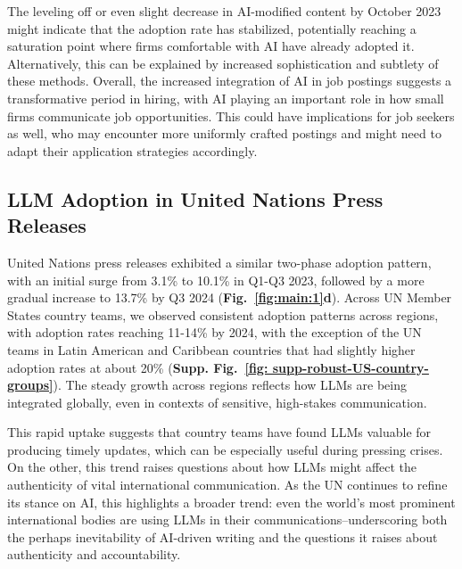 The leveling off or even slight decrease in AI-modified content by October 2023 might indicate that the adoption rate has stabilized, potentially reaching a saturation point where firms comfortable with AI have already adopted it. Alternatively, this can be explained by increased sophistication and subtlety of these methods. Overall, the increased integration of AI in job postings suggests a transformative period in hiring, with AI playing an important role in how small firms communicate job opportunities. This could have implications for job seekers as well, who may encounter more uniformly crafted postings and might need to adapt their application strategies accordingly.


\subsection*{LLM Adoption in United Nations Press Releases}

United Nations press releases exhibited a similar two-phase adoption pattern, with an initial surge from 3.1\% to 10.1\% in Q1-Q3 2023, followed by a more gradual increase to 13.7\% by Q3 2024 (\textbf{Fig.~\ref{fig:main:1}d}). 
Across UN Member States country teams, we observed consistent adoption patterns across regions, with adoption rates reaching 11-14\% by 2024, with the exception of the UN teams in Latin American and Caribbean countries that had slightly higher adoption rates at about 20\% (\textbf{Supp. Fig.~\ref{fig: supp-robust-US-country-groups}}). The steady growth across regions reflects how LLMs are being integrated globally, even in contexts of sensitive, high-stakes communication. 

This rapid uptake suggests that country teams have found LLMs valuable for producing timely updates, which can be especially useful during pressing crises. On the other, this trend raises questions about how LLMs might affect the authenticity of vital international communication. As the UN continues to refine its stance on AI, this highlights a broader trend: even the world’s most prominent international bodies are using LLMs in their communications--underscoring both the perhaps inevitability of AI-driven writing and the questions it raises about authenticity and accountability.


